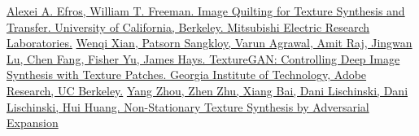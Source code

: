 \documentclass[12pt,a4paper]{report}
\begin{document}
\begin{thebibliography}{99}
 \href{https://people.eecs.berkeley.edu/~efros/research/quilting/quilting.pdf}{Alexei A. Efros, William T. Freeman. Image Quilting for Texture Synthesis and Transfer. University of California, Berkeley. Mitsubishi Electric Research Laboratories.}
 \href{https://arxiv.org/pdf/1706.02823v3.pdf}{Wenqi Xian, Patsorn Sangkloy, Varun Agrawal, Amit Raj, Jingwan Lu, Chen Fang, Fisher Yu, James Hays. TextureGAN: Controlling Deep Image Synthesis with Texture Patches. Georgia Institute of Technology, Adobe Research, UC Berkeley.}
 \href{https://arxiv.org/pdf/1805.04487v1.pdf}{Yang Zhou, Zhen Zhu, Xiang Bai, Dani Lischinski, Dani Lischinski, Hui Huang. Non-Stationary Texture Synthesis by Adversarial Expansion}
\end{thebibliography}
\end{document}
